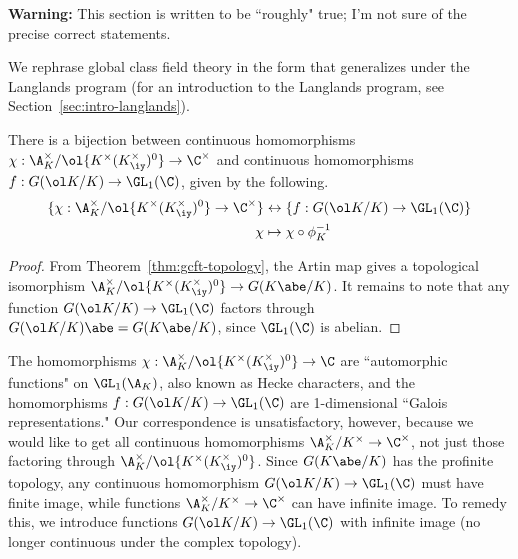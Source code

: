 \textbf{Warning:} This section is written to be ``roughly" true; I'm not sure of the precise correct statements.

We rephrase global class field theory in the form that generalizes under the Langlands program (for an introduction to the Langlands program, see Section~\ref{sec:intro-langlands}).
\begin{thm}
There is a bijection between continuous homomorphisms $\chi:\A_K^{\times}/\ol{K^{\times}(K^{\times}_{\iy})^0}\to \C^{\times}$ and continuous homomorphisms $f:G(\ol K/K)\to \GL_1(\C)$, given by the following.
\begin{align*}
\{
\chi:\A_K^{\times}/\ol{K^{\times}(K^{\times}_{\iy})^0}\to \C^{\times}
\}
&\leftrightarrow
\{f:G(\ol K/K)\to \GL_1(\C)\} \\
\chi&\mapsto \chi\circ \phi_K^{-1}
\end{align*}
\end{thm}
\begin{proof}
From Theorem~\ref{thm:gcft-topology}, the Artin map gives a topological isomorphism $ \A_K^{\times}/\ol{K^{\times}(K^{\times}_{\iy})^0}\to G(K\abe/K)$. It remains to note that any function $G(\ol K/K)\to \GL_1(\C)$ factors through $G(\ol K/K)\abe=G(K\abe/K)$, since $\GL_1(\C)$ is abelian.
\end{proof}
The homomorphisms $\chi:\A_K^{\times}/\ol{K^{\times}(K^{\times}_{\iy})^0}\to \C$ are ``automorphic functions" on $\GL_1(\A_K)$, also known as Hecke characters, and the homomorphisms $f:G(\ol K/K)\to \GL_1(\C)$ are 1-dimensional ``Galois representations." Our correspondence is unsatisfactory, however, because we would like to get all continuous homomorphisms $\A_K^{\times}/K^{\times}\to \C^{\times}$, not just those factoring through $\A_K^{\times}/\ol{K^{\times}(K^{\times}_{\iy})^0}$. Since $G(K\abe/K)$ has the profinite topology, %
any continuous homomorphism $G(\ol K/K)\to \GL_1(\C)$ must have finite image, while functions $\A_K^{\times}/K^{\times}\to \C^{\times}$ can have infinite image. To remedy this, we introduce functions $G(\ol K/K)\to \GL_1(\C)$ with infinite image (no longer continuous under the complex topology). 
